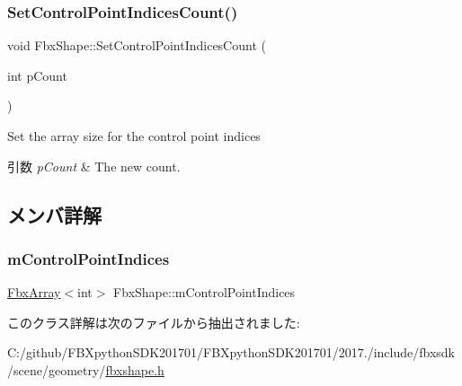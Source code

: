 \subsubsection{\texorpdfstring{Set\+Control\+Point\+Indices\+Count()}{SetControlPointIndicesCount()}}
{\footnotesize\ttfamily void Fbx\+Shape\+::\+Set\+Control\+Point\+Indices\+Count (\begin{DoxyParamCaption}\item[{int}]{p\+Count }\end{DoxyParamCaption})}

Set the array size for the control point indices 
\begin{DoxyParams}{引数}
{\em p\+Count} & The new count. \\
\hline
\end{DoxyParams}


\subsection{メンバ詳解}
\mbox{\label{class_fbx_shape_ae27b2ace894858d90213f44ebe3f23a1}} 
\subsubsection{\texorpdfstring{m\+Control\+Point\+Indices}{mControlPointIndices}}
{\footnotesize\ttfamily \hyperlink{class_fbx_array}{Fbx\+Array}$<$int$>$ Fbx\+Shape\+::m\+Control\+Point\+Indices\hspace{0.3cm}{\ttfamily [protected]}}



このクラス詳解は次のファイルから抽出されました\+:\begin{DoxyCompactItemize}
\item 
C\+:/github/\+F\+B\+Xpython\+S\+D\+K201701/\+F\+B\+Xpython\+S\+D\+K201701/2017./include/fbxsdk/scene/geometry/\hyperlink{fbxshape_8h}{fbxshape.\+h}\end{DoxyCompactItemize}
